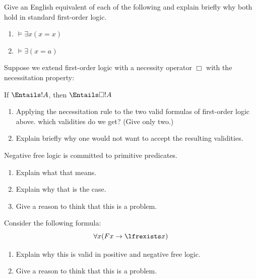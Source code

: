\documentclass[../../../../include/open-logic-section]{subfiles}
\begin{document}


\begin{prob}
Give an English equivalent of each of the following and explain briefly why both
 hold in standard first-order logic.
\begin{enumerate}
\item $\models\exists x(x=x)$
\item $\models\exists(x=a)$
\end{enumerate}

Suppose we extend first-order logic with a necessity operator $\Box$ with the  
necessitation property:
\begin{defn}
If $\Entails !A$, then $\Entails \Box !A$
\end{defn}

\begin{enumerate}
	\item Applying the necessitation rule to the two valid formulas of first-order logic above. which validities do we get? (Give only two.) 
	\item Explain briefly why one would not want to accept the resulting validities.
\end{enumerate}
\end{prob}

\begin{prob}
Negative free logic is committed to primitive predicates.
\begin{enumerate}
	\item Explain what that means.
	\item Explain why that is the case.
	\item Give a reason to think that this is a problem.
\end{enumerate}
\end{prob}

\begin{prob}
Consider the following formula:
$$\forall x (Fx \rightarrow \lfrexists x)$$
\begin{enumerate}
	\item Explain why this is valid in positive and negative free logic.
	\item Give a reason to think that this is a problem.
\end{enumerate}
\end{prob}
\end{document}
